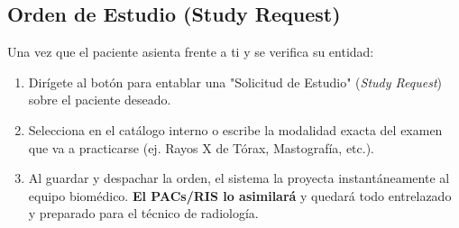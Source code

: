 \subsection{Orden de Estudio (Study Request)}

Una vez que el paciente asienta frente a ti y se verifica su entidad:
\begin{enumerate}
    \item Dirígete al botón para entablar una "Solicitud de Estudio" (\textit{Study Request}) sobre el paciente deseado.
    \item Selecciona en el catálogo interno o escribe la modalidad exacta del examen que va a practicarse (ej. Rayos X de Tórax, Mastografía, etc.).
    \item Al guardar y despachar la orden, el sistema la proyecta instantáneamente al equipo biomédico. \textbf{El PACs/RIS lo asimilará} y quedará todo entrelazado y preparado para el técnico de radiología.
\end{enumerate}
